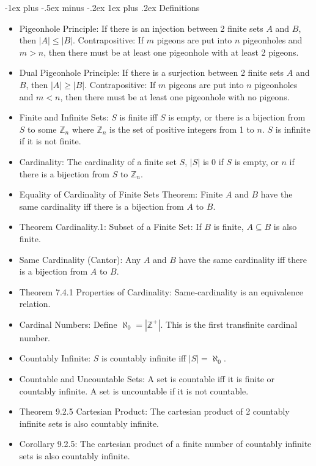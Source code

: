 \documentclass[10pt, portrait]{article}
\makeatletter
\renewcommand{\subsection}{\@startsection{subsection}{3}{0mm}%
                                {-1ex plus -.5ex minus -.2ex}%
                                {1ex plus .2ex}%
                                {\normalfont\small\bfseries}}%
\makeatother
\begin{document}
\begin{multicols*}{2}
\subsection{Definitions}
\begin{itemize}
    \item Pigeonhole Principle: If there is an injection between 2 finite sets $A$ and $B$, then $|A| \leq |B|$. Contrapositive: If $m$ pigeons are put into $n$ pigeonholes and $m > n$, then there must be at least one pigeonhole with at least 2 pigeons.
    \item Dual Pigeonhole Principle: If there is a surjection between 2 finite sets $A$ and $B$, then $|A| \geq |B|$. Contrapositive: If $m$ pigeons are put into $n$ pigeonholes and $m < n$, then there must be at least one pigeonhole with no pigeons.
    \item Finite and Infinite Sets: $S$ is finite iff $S$ is empty, or there is a bijection from $S$ to some $\mathbb{Z}_n$ where $\mathbb{Z}_n$ is the set of positive integers from 1 to $n$. $S$ is infinite if it is not finite.
    \item Cardinality: The cardinality of a finite set $S$, $|S|$ is 0 if $S$ is empty, or $n$ if there is a bijection from $S$ to $\mathbb{Z}_n$.
    \item Equality of Cardinality of Finite Sets Theorem: Finite $A$ and $B$ have the same cardinality iff there is a bijection from $A$ to $B$.
    \item Theorem Cardinality.1: Subset of a Finite Set: If $B$ is finite, $A \subseteq B$ is also finite.
    \item Same Cardinality (Cantor): Any $A$ and $B$ have the same cardinality iff there is a bijection from $A$ to $B$.
    \item Theorem 7.4.1 Properties of Cardinality: Same-cardinality is an equivalence relation.
    \item Cardinal Numbers: Define $\aleph_0 = |\mathbb{Z}^+|$. This is the first transfinite cardinal number.
    \item Countably Infinite: $S$ is countably infinite iff $|S| = \aleph_0$.
    \item Countable and Uncountable Sets: A set is countable iff it is finite or countably infinite. A set is uncountable if it is not countable.
    \item Theorem 9.2.5 Cartesian Product: The cartesian product of 2 countably infinite sets is also countably infinite.
    \item Corollary 9.2.5: The cartesian product of a finite number of countably infinite sets is also countably infinite.

\end{itemize}
\end{multicols*}
\end{document}

